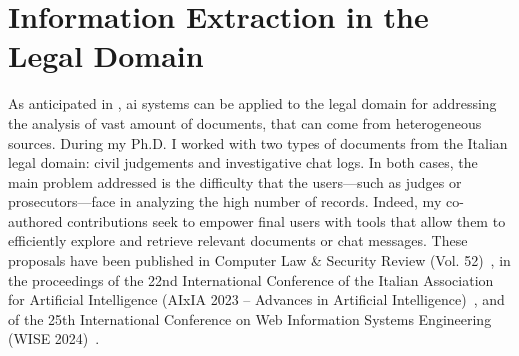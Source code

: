 \chapter{Information Extraction in the Legal Domain}
\label{chap:legalie}


As anticipated in , \ac{ai} systems can be applied to the legal domain for addressing the analysis of vast amount of documents, that can come from heterogeneous sources.
During my Ph.D. I worked with two types of documents from the Italian legal domain: civil judgements and investigative chat logs. In both cases, the main problem addressed is the difficulty that the users---such as judges or prosecutors---face in analyzing the high number of records. Indeed, my co-authored contributions seek to empower final users with tools that allow them to efficiently explore and retrieve relevant documents or chat messages.
These proposals have been published in Computer Law \& Security Review (Vol. 52)~\cite{BELLANDI2024}, in the proceedings of the 22nd International Conference of the Italian Association for Artificial Intelligence (AIxIA 2023 -- Advances in Artificial Intelligence)~\cite{aixia_2023}, and of the 25th International Conference on Web Information Systems Engineering (WISE 2024)~\cite{pozzi_wise_2025}.

